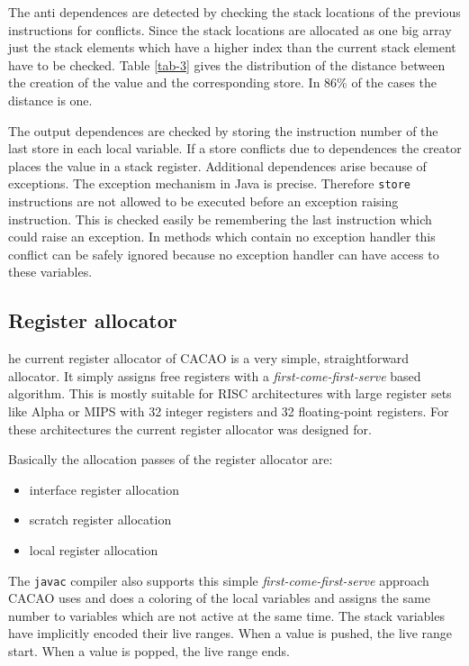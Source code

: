 The anti dependences are detected by checking the stack locations of the
previous instructions for conflicts. Since the stack locations are
allocated as one big array just the stack elements which have a higher
index than the current stack element have to be checked. Table \ref{tab-3}
gives the distribution of the distance between the creation of the value
and the corresponding store. In 86\% of the cases the distance is one.

The output dependences are checked by storing the instruction number of the
last store in each local variable. If a store conflicts due to dependences
the creator places the value in a stack register. Additional dependences
arise because of exceptions. The exception mechanism in Java is precise.
Therefore {\tt store} instructions are not allowed to be executed before
an exception raising instruction. This is checked easily be remembering
the last instruction which could raise an exception. In methods which contain
no exception handler this conflict can be safely ignored because no
exception handler can have access to these variables.


\subsection{Register allocator}

he current register allocator of CACAO is a very simple,
straightforward allocator. It simply assigns free registers with a
\textit{first-come-first-serve} based algorithm. This is mostly
suitable for RISC architectures with large register sets like Alpha or
MIPS with 32 integer registers and 32 floating-point registers. For
these architectures the current register allocator was designed for.

Basically the allocation passes of the register allocator are:

\begin{itemize}
 \item interface register allocation
 \item scratch register allocation
 \item local register allocation
\end{itemize}

The \texttt{javac} compiler also supports this simple
\textit{first-come-first-serve} approach CACAO uses and does a
coloring of the local variables and assigns the same number to
variables which are not active at the same time. The stack variables
have implicitly encoded their live ranges. When a value is pushed, the
live range start. When a value is popped, the live range ends.


